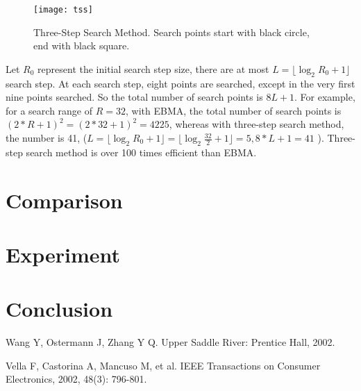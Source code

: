 \documentclass[a4paper, twocolumn]{article}
\begin{document}
	\begin{figure}[h]
	\centering
	\texttt{[image: tss]}
	\caption{Three-Step Search Method. Search points start with black circle, end with black square.}
	\label{fig:tss}
	\end{figure}
	
	\noindent
	Let $ R_{0} $ represent the initial search step size, there are at most $ L = \lfloor   \log_{2}{R_{0} + 1} \rfloor $ search step. At each search step, eight points are searched, except in the very first nine points searched. So the total number of search points is $ 8L + 1 $. For example, for a search range of $ R = 32 $, with EBMA, the total number of search points is $ (2*R+1)^2 = (2*32+1)^2 = 4225 $, whereas with three-step search method, the number is 41, ($ L = \lfloor   \log_{2}{R_{0} + 1} \rfloor = \lfloor   \log_{2}{\frac{32}{2} + 1} \rfloor = 5, 8*L+1 = 41$ ). Three-step search method is over 100 times efficient than EBMA.

	
	\section{Comparison}
	
	
	
	\section{Experiment}
		
		
	
	\section{Conclusion}
	
	
	
	\begin{thebibliography}{99} %
		
		Wang Y, Ostermann J, Zhang Y Q. 
		\newblock Upper Saddle River: Prentice Hall, 2002.
		
		Vella F, Castorina A, Mancuso M, et al. 
		\newblock IEEE Transactions on Consumer Electronics, 2002, 48(3): 796-801.
		
	\end{thebibliography}
	
	
\end{document}
